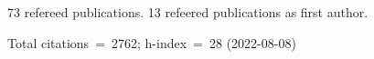 73 refereed publications. 13 refeered publications as first author.

Total citations~=~2762; h-index~=~28 (2022-08-08)